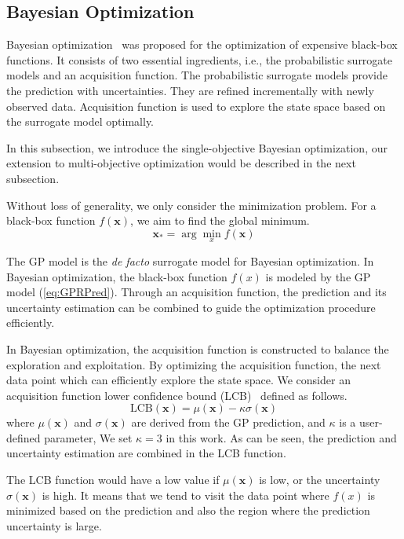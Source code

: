 \subsection{Bayesian Optimization}

Bayesian optimization~\cite{shahriari2016taking} was proposed for the optimization
of expensive black-box functions. It consists of two essential ingredients,
i.e., the probabilistic surrogate models and an acquisition function. The
probabilistic surrogate models provide the prediction with uncertainties. They are
refined incrementally with newly observed data. Acquisition function is used to
explore the state space based on the surrogate model optimally.

In this subsection, we introduce the single-objective Bayesian optimization,
our extension to multi-objective optimization would be described in the next
subsection.

Without loss of generality, we only consider the minimization problem. For a
black-box function $f(\mathbf{x})$, we aim to find the global minimum.
\begin{equation}
    \label{eq:BO_Formulation}
    \mathbf{x}_* = \arg\min_{x} f(\mathbf{x})
\end{equation}

The GP model is the \emph{de facto} surrogate model for Bayesian optimization.
In Bayesian optimization, the black-box function $f(x)$ is modeled by the GP
model (\ref{eq:GPRPred}). Through an acquisition function, the prediction and
its uncertainty estimation can be combined to guide the optimization
procedure efficiently.

In Bayesian optimization, the acquisition function is constructed to balance
the exploration and exploitation. By optimizing the acquisition function, the
next data point which can efficiently explore the state space.  We consider an
acquisition function lower confidence bound (LCB)~\cite{liu2014gaspad} defined
as follows.
\begin{equation}
    \label{eq:LCB}
    \mathrm{LCB}(\mathbf{x}) = \mu(\mathbf{x}) - \kappa \sigma(\mathbf{x})
\end{equation}
where $\mu(\mathbf{x})$ and $\sigma(\mathbf{x})$ are derived from the GP prediction, and
$\kappa$ is a user-defined parameter, We set $\kappa = 3$ in this work. As can
be seen, the prediction and uncertainty estimation are combined in the LCB function.

The LCB function would have a low value if $\mu(\mathbf{x})$ is low, or the
uncertainty $\sigma(\mathbf{x})$ is high. It means that we tend to visit the data
point where $f(x)$ is minimized based on the prediction and also the region
where the prediction uncertainty is large.

